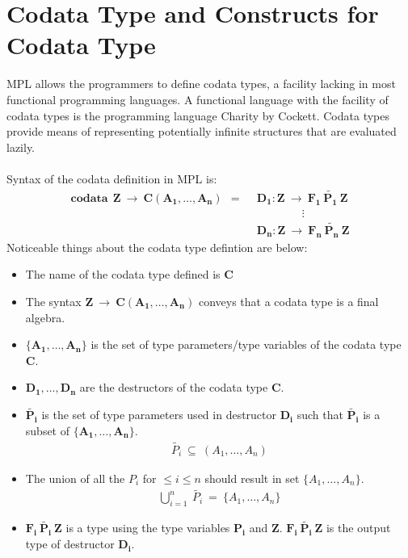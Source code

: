 \documentclass[11pt]{article}
\begin{document}
\section {Codata Type and Constructs for Codata Type}\label{SeqMPL:codataandCDCons}
MPL allows the programmers to define codata types, a facility lacking in most functional programming languages. A functional language with the facility of codata types is the programming language Charity by Cockett. Codata types provide means of representing potentially infinite structures that are evaluated lazily.
~~\\~~\\
Syntax of the codata definition in MPL is:
\begin{align*} 
\mathbf{codata~~Z~\to~C(A_1,\ldots,A_n)~~=~~}
        &\mathbf{D_1: Z~\to~F_1~\tilde{P_1}~Z}\\
        &\mathbf{\qquad\qquad \vdots} \\    
        &\mathbf{D_n: Z~\to~F_n~\tilde{P_n}~Z}
\end{align*}
Noticeable things about the codata type defintion are below:
\begin{itemize}
  \item The name of the codata type defined is $\mathbf{C}$
  \item The syntax $\mathbf{Z~\to~C(A_1,\ldots,A_n)}$ conveys that a codata type is a final algebra.
  \item $\mathbf{\{A_1,\ldots,A_n\}}$ is the set of type parameters/type variables of the codata type $\mathbf{C}$.
  \item $\mathbf{D_1,\ldots,D_n}$ are the destructors of the codata type $\mathbf{C}$.
  \item $\mathbf{\tilde{P_i}}$ is the set of type parameters used in destructor $\mathbf{D_i}$ such that $\mathbf{\tilde{P_i}}$ is a subset of $\mathbf{\{A_1,\ldots,A_n\}}$.
  \begin{align*}
    \tilde{P_i}~\subseteq~(A_1,\ldots,A_n)
  \end{align*}
  \item The union of all the ${P_i}$ for $\leq i \leq n$ should result in set $\{A_1,\ldots,A_n\}$.   
  \begin{align*}
    \bigcup\limits_{i=1}^{n}~\tilde{P_i}~=~\{A_1,\ldots,A_n\}
  \end{align*}
  \item $\mathbf{F_i~\tilde{P_i}~Z}$ is a type using the type variables $\mathbf{P_i}$ and $\mathbf{Z}$. $\mathbf{F_i~\tilde{P_i}~Z}$ is the output type of destructor $\mathbf{D_i}$.
\end{itemize}
\end{document}
